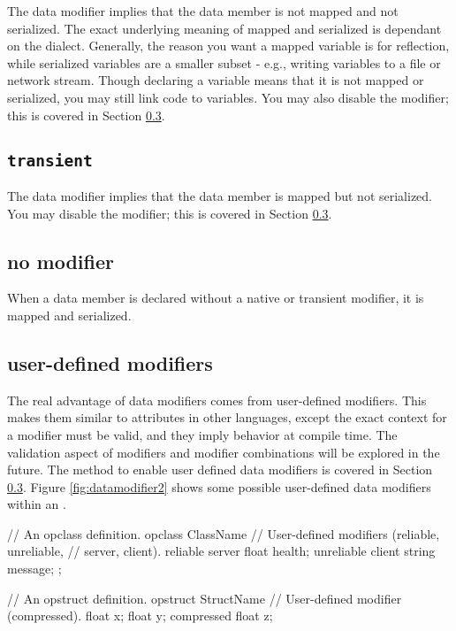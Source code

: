 The  data modifier implies that the data member is not mapped and not serialized.  The exact underlying meaning of mapped and serialized is dependant on the dialect.  Generally, the reason you want a mapped variable is for reflection, while serialized variables are a smaller subset - e.g., writing variables to a file or network stream.  Though declaring a variable  means that it is not mapped or serialized, you may still link code to  variables.  You may also disable the  modifier; this is covered in Section \ref{}.  

\subsection{{\tt transient}}

The  data modifier implies that the data member is mapped but not serialized.  You may disable the  modifier; this is covered in Section \ref{}.

\subsection{no modifier}

When a data member is declared without a native or transient modifier, it is mapped and serialized.

\subsection{user-defined modifiers}

The real advantage of data modifiers comes from user-defined modifiers.  This makes them similar to attributes in other languages, except the exact context for a modifier must be valid, and they imply behavior at compile time.  The validation aspect of modifiers and modifier combinations will be explored in the future.  The method to enable user defined data modifiers is covered in Section \ref{}.  Figure \ref{fig:datamodifier2} shows some possible user-defined data modifiers within an .

\begin{opcpp}[label={fig:datamodifier2},caption={Some possible user-defined data modifiers.}]
// An opclass definition.
opclass ClassName
{
	// User-defined modifiers (reliable, unreliable,
	// server, client).
	reliable server float health;
	unreliable client string message;
};

// An opstruct definition.
opstruct StructName
{
	// User-defined modifier (compressed).
	float x;
	float y;
	compressed float z; 
}

\end{opcpp}

